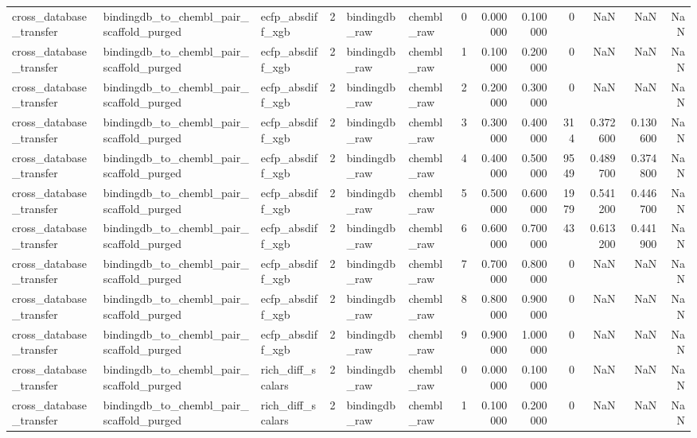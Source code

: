 \begin{longtable}{lllrllrrrrrrr}
cross\_database\_transfer & bindingdb\_to\_chembl\_pair\_scaffold\_purged & ecfp\_absdiff\_xgb & 2 & bindingdb\_raw & chembl\_raw & 0 & 0.000000 & 0.100000 & 0 & NaN & NaN & NaN \\
cross\_database\_transfer & bindingdb\_to\_chembl\_pair\_scaffold\_purged & ecfp\_absdiff\_xgb & 2 & bindingdb\_raw & chembl\_raw & 1 & 0.100000 & 0.200000 & 0 & NaN & NaN & NaN \\
cross\_database\_transfer & bindingdb\_to\_chembl\_pair\_scaffold\_purged & ecfp\_absdiff\_xgb & 2 & bindingdb\_raw & chembl\_raw & 2 & 0.200000 & 0.300000 & 0 & NaN & NaN & NaN \\
cross\_database\_transfer & bindingdb\_to\_chembl\_pair\_scaffold\_purged & ecfp\_absdiff\_xgb & 2 & bindingdb\_raw & chembl\_raw & 3 & 0.300000 & 0.400000 & 314 & 0.372600 & 0.130600 & NaN \\
cross\_database\_transfer & bindingdb\_to\_chembl\_pair\_scaffold\_purged & ecfp\_absdiff\_xgb & 2 & bindingdb\_raw & chembl\_raw & 4 & 0.400000 & 0.500000 & 9549 & 0.489700 & 0.374800 & NaN \\
cross\_database\_transfer & bindingdb\_to\_chembl\_pair\_scaffold\_purged & ecfp\_absdiff\_xgb & 2 & bindingdb\_raw & chembl\_raw & 5 & 0.500000 & 0.600000 & 1979 & 0.541200 & 0.446700 & NaN \\
cross\_database\_transfer & bindingdb\_to\_chembl\_pair\_scaffold\_purged & ecfp\_absdiff\_xgb & 2 & bindingdb\_raw & chembl\_raw & 6 & 0.600000 & 0.700000 & 43 & 0.613200 & 0.441900 & NaN \\
cross\_database\_transfer & bindingdb\_to\_chembl\_pair\_scaffold\_purged & ecfp\_absdiff\_xgb & 2 & bindingdb\_raw & chembl\_raw & 7 & 0.700000 & 0.800000 & 0 & NaN & NaN & NaN \\
cross\_database\_transfer & bindingdb\_to\_chembl\_pair\_scaffold\_purged & ecfp\_absdiff\_xgb & 2 & bindingdb\_raw & chembl\_raw & 8 & 0.800000 & 0.900000 & 0 & NaN & NaN & NaN \\
cross\_database\_transfer & bindingdb\_to\_chembl\_pair\_scaffold\_purged & ecfp\_absdiff\_xgb & 2 & bindingdb\_raw & chembl\_raw & 9 & 0.900000 & 1.000000 & 0 & NaN & NaN & NaN \\
cross\_database\_transfer & bindingdb\_to\_chembl\_pair\_scaffold\_purged & rich\_diff\_scalars & 2 & bindingdb\_raw & chembl\_raw & 0 & 0.000000 & 0.100000 & 0 & NaN & NaN & NaN \\
cross\_database\_transfer & bindingdb\_to\_chembl\_pair\_scaffold\_purged & rich\_diff\_scalars & 2 & bindingdb\_raw & chembl\_raw & 1 & 0.100000 & 0.200000 & 0 & NaN & NaN & NaN \\

\end{longtable}
